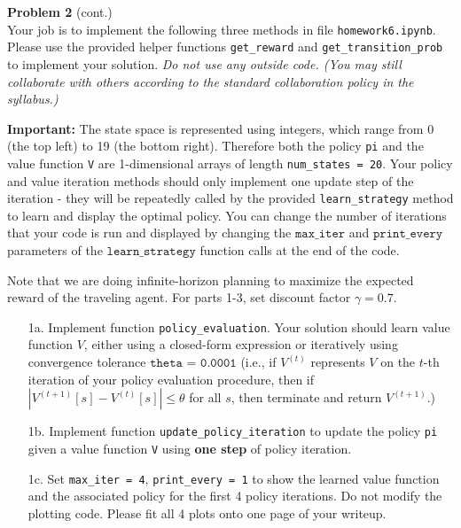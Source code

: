 \documentclass[submit]{../harvardml}
\begin{document}
\begin{framed}
\textbf{Problem 2} (cont.)\\

Your job is to implement the following three methods in file \texttt{homework6.ipynb}. Please use the provided helper functions \texttt{get\_reward} and \texttt{get\_transition\_prob} to implement your solution. \emph{Do not use any outside code.  (You may still collaborate with others according to the standard collaboration policy in the syllabus.)}  

\textbf{Important: } The state space is represented using integers, which range from 0 (the top left) to 19 (the bottom right). Therefore both the policy \texttt{pi} and the value function \texttt{V} are 1-dimensional arrays of length \texttt{num\_states = 20}. Your policy and value iteration methods should only implement one update step of the iteration - they will be repeatedly called by the provided \texttt{learn\_strategy} method to learn and display the optimal policy. You can change the number of iterations that your code is run and displayed by changing the $\texttt{max\_iter}$ and $\texttt{print\_every}$ parameters of the $\texttt{learn\_strategy}$ function calls at the end of the code.

Note that we are doing infinite-horizon planning to maximize the expected reward of the traveling agent. For parts 1-3, set discount factor $\gamma = 0.7$.

\begin{itemize}
    \item[1a.]  Implement function \texttt{policy\_evaluation}.  Your
      solution should learn value function $V$, either using a closed-form expression or iteratively using
      convergence tolerance $\texttt{theta = 0.0001}$ (i.e., if
      $V^{(t)}$ represents $V$ on the $t$-th iteration of your policy
      evaluation procedure, then if $|V^{(t + 1)}[s] - V^{(t)}[s]|
      \leq \theta$ for all $s$, then terminate and return $V^{(t + 1)}$.)

    \item[1b.] Implement function \texttt{update\_policy\_iteration} to update the policy \texttt{pi} given a value function \texttt{V} using \textbf{one step} of policy iteration.
    
    \item[1c.] Set \texttt{max\_iter = 4}, \texttt{print\_every = 1} to show the learned value function and the associated policy for the first 4 policy iterations. Do not modify the plotting code. Please fit all 4 plots onto one page of your writeup.
    

\end{itemize}
\end{framed}
\end{document}
